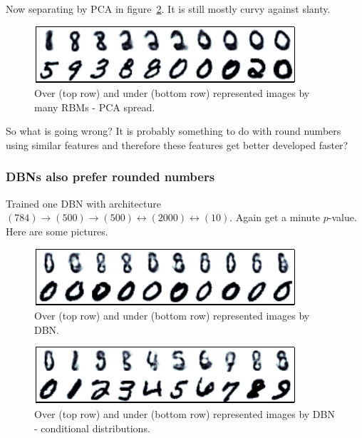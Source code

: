 \documentclass{article}
\begin{document}
Now separating by PCA in figure~\ref{fig:many_rbm_over_under}.
It is still mostly curvy against slanty.

\begin{figure}[ht]
\centering
\includegraphics[width=0.98\columnwidth]{figures/many_rbm_over_under_pca}
\caption{
Over (top row) and under (bottom row) represented images by many RBMs - PCA spread.
}
\label{fig:many_rbm_over_under_pca}
\end{figure}

So what is going wrong?
It is probably something to do with round numbers using similar features and therefore these features get better developed faster?

\subsubsection{DBNs also prefer rounded numbers}


Trained one DBN with architecture $(784)\rightarrow(500)\rightarrow(500)\leftrightarrow(2000)\leftrightarrow(10)$.
Again get a minute $p$-value.
Here are some pictures.

\begin{figure}[ht]
\centering
\includegraphics[width=0.98\columnwidth]{figures/dbn_over_under}
\caption{
Over (top row) and under (bottom row) represented images by DBN.
}
\label{fig:many_rbm_over_under}
\end{figure}

\begin{figure}[ht]
\centering
\includegraphics[width=0.98\columnwidth]{figures/dbn_over_under_digit}
\caption{
Over (top row) and under (bottom row) represented images by DBN - conditional distributions.
}
\label{fig:many_rbm_over_under_digit}
\end{figure}
\end{document}
